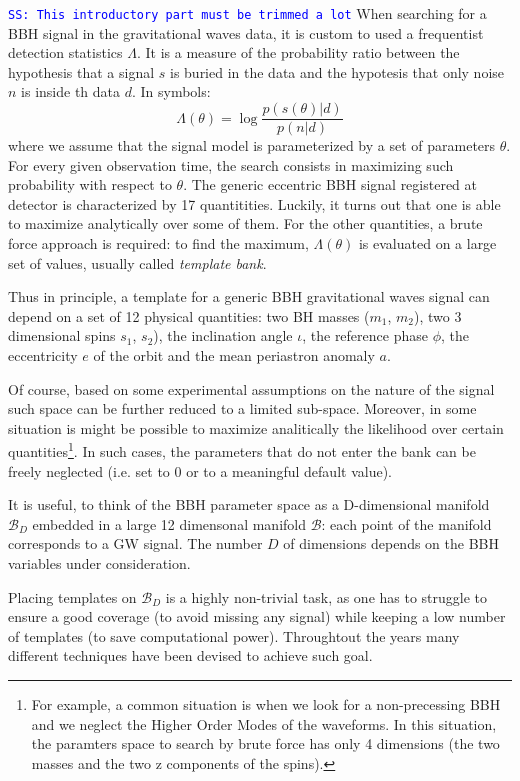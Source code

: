 \documentclass[twocolumn,showpacs,preprintnumbers,nofootinbib,prd,
superscriptaddress,10pt]{revtex4-1}
\newcommand{\stefano}[1]{{\textcolor{blue}{\texttt{SS: #1}} }}
\begin{document}
\stefano{This introductory part must be trimmed a lot}
When searching for a BBH signal in the gravitational waves data, it is custom to used a frequentist detection statistics $\Lambda$. It is a measure of the probability ratio between the hypothesis that a signal $s$ is buried in the data and the hypotesis that only noise $n$ is inside th data $d$. In symbols:
\begin{equation}\label{eq:LL}
	\Lambda(\theta) = \log\frac{p(s(\theta)|d)}{p(n|d)}
\end{equation}
where we assume that the signal model is parameterized by a set of parameters $\theta$.
For every given observation time, the search consists in maximizing such probability with respect to $\theta$. 
The generic eccentric BBH signal registered at detector is characterized by 17 quantitities. Luckily, it turns out that one is able to maximize analytically over some of them. For the other quantities, a brute force approach is required: to find the maximum, $\Lambda(\theta)$ is evaluated on a large set of values, usually called {\it template bank}. 

Thus in principle, a template for a generic BBH gravitational waves signal can depend on a set of 12 physical quantities: two BH masses ($m_1$, $m_2$), two 3 dimensional spins $s_1$, $s_2$), the inclination angle $\iota$, the reference phase $\phi$, the eccentricity $e$ of the orbit and the mean periastron anomaly $a$.

Of course, based on some experimental assumptions on the nature of the signal such space can be further reduced to a limited sub-space. Moreover, in some situation is might be possible to maximize analitically the likelihood over certain quantities\footnote{
For example, a common situation is when we look for a non-precessing BBH and we neglect the Higher Order Modes of the waveforms. In this situation, the paramters space to search by brute force has only 4 dimensions (the two masses and the two z components of the spins).}.
In such cases, the parameters that do not enter the bank can be freely neglected (i.e. set to $0$ or to a meaningful default value).

It is useful, to think of the BBH parameter space as a D-dimensional manifold $\mathcal{B}_D$ embedded in a large 12 dimensonal manifold $\mathcal{B}$: each point of the manifold corresponds to a GW signal. The number $D$ of dimensions depends on the BBH variables under consideration.

Placing templates on $\mathcal{B}_D$ is a highly non-trivial task, as one has to struggle to ensure a good coverage (to avoid missing any signal) while keeping a low number of templates (to save computational power).
Throughtout the years many different techniques have been devised to achieve such goal.
\end{document}
